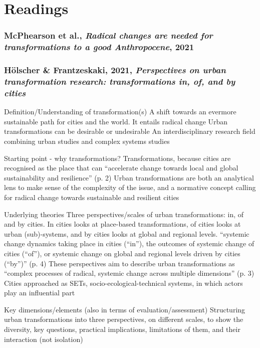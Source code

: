 \documentclass{article}
\begin{document}
\section{Readings}

\subsubsection{McPhearson et al., \textit{Radical changes are needed for transformations to a good Anthropocene}, 2021}

\subsubsection{Hölscher \& Frantzeskaki, 2021, \textit{Perspectives on urban transformation research: transformations in, of, and by cities}}

\begin{outline}
	\1 Definition/Understanding of transformation(s)
		\2 A shift towards an evermore sustainable path for cities and the world. It entails radical change
		\2 Urban transformations can be desirable or undesirable
		\2 An interdisciplinary research field combining urban studies and complex systems studies

	\1 Starting point - why transformations?
		\2 Transformations, because cities are recognised as the place that can ``accelerate change towards local and global sustainability and resilience'' (p. 2)
		\2 Urban transformations are both an analytical lens to make sense of the complexity of the issue, and a normative concept calling for radical change towards sustainable and resilient cities
		
	\1 Underlying theories
		\2 Three perspectives/scales of urban transformations: in, of and by cities. In cities looks at place-based transformations, of cities looks at urban (sub)-systems, and by cities looks at global and regional levels. ``systemic change dynamics taking place in cities (``in''), the outcomes of systemic change of cities (``of''), or systemic change on global and regional levels driven by cities (``by'')'' (p. 4)
		\2 These perspectives aim to describe urban transformations as ``complex processes of radical, systemic change across multiple dimensions'' (p. 3)
		\2 Cities approached as SETs, socio-ecological-technical systems, in which actors play an influential part
		
	\1 Key dimensions/elements (also in terms of evaluation/assessment)
		\2 Structuring urban transformations into three perspectives, on different scales, to show the diversity, key questions, practical implications, limitations of them, and their interaction (not isolation)
\end{outline}
\end{document}
